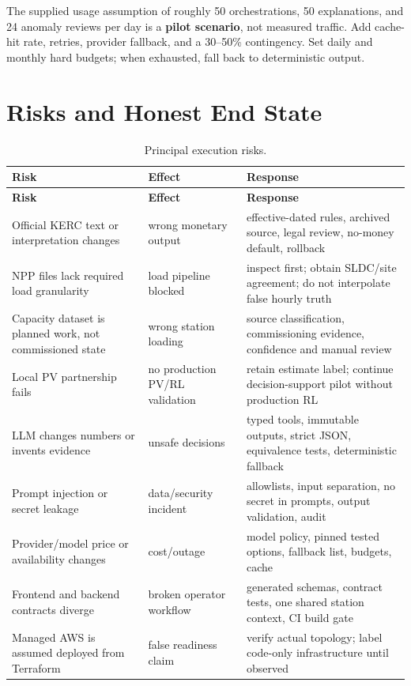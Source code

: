 The supplied usage assumption of roughly 50 orchestrations, 50 explanations, and 24 anomaly
reviews per day is a \textbf{pilot scenario}, not measured traffic. Add cache-hit rate, retries,
provider fallback, and a 30--50\% contingency. Set daily and monthly hard budgets; when exhausted,
fall back to deterministic output.

\section{Risks and Honest End State}

\begin{footnotesize}
\begin{longtable}{@{}L{3.6cm}L{4.1cm}L{6.9cm}@{}}
\caption{Principal execution risks.}\label{tab:risks}\\
\toprule
\textbf{Risk} & \textbf{Effect} & \textbf{Response}\\
\midrule
\endfirsthead
\toprule
\textbf{Risk} & \textbf{Effect} & \textbf{Response}\\
\midrule
\endhead
\bottomrule
\endfoot
Official KERC text or interpretation changes & wrong monetary output &
effective-dated rules, archived source, legal review, no-money default, rollback\\
NPP files lack required load granularity & load pipeline blocked &
inspect first; obtain SLDC/site agreement; do not interpolate false hourly truth\\
Capacity dataset is planned work, not commissioned state & wrong station loading &
source classification, commissioning evidence, confidence and manual review\\
Local PV partnership fails & no production PV/RL validation &
retain estimate label; continue decision-support pilot without production RL\\
LLM changes numbers or invents evidence & unsafe decisions &
typed tools, immutable outputs, strict JSON, equivalence tests, deterministic fallback\\
Prompt injection or secret leakage & data/security incident &
allowlists, input separation, no secret in prompts, output validation, audit\\
Provider/model price or availability changes & cost/outage &
model policy, pinned tested options, fallback list, budgets, cache\\
Frontend and backend contracts diverge & broken operator workflow &
generated schemas, contract tests, one shared station context, CI build gate\\
Managed AWS is assumed deployed from Terraform & false readiness claim &
verify actual topology; label code-only infrastructure until observed\\
\end{longtable}
\end{footnotesize}

